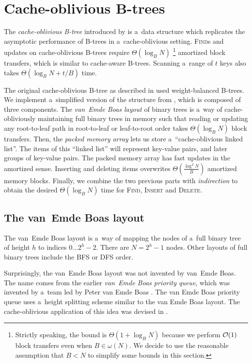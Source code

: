 \chapter{Cache-oblivious B-trees}
\label{chapter:cob}
The \emph{cache-oblivious B-tree} introduced by \cite{cobt}
is a~data structure which replicates the asymptotic performance of B-trees
in a~cache-oblivious setting.
\textsc{Find}s and updates on cache-oblivious B-trees require $\Theta(\log_B N)$
\footnote{Strictly speaking, the bound is $\Theta(1+\log_B N)$
	because we perform $\mathcal{O}(1)$ block transfers even when $B\in\omega(N)$.
	We decide to use the reasonable assumption that
	$B<N$ to simplify some bounds in this section.}
amortized block transfers, which is similar to cache-aware B-trees.
Scanning a~range of $t$ keys also takes $\Theta(\log_B N+t/B)$ time.

The original cache-oblivious B-tree as described in \cite{cobt} used
weight-balanced B-trees. We implement a~simplified version of the structure
from \cite{brodal01}, which is composed of three components.
The \emph{van~Emde Boas layout} of binary trees is a~way of cache-obliviously
maintaining full binary trees in memory such that reading or updating any
root-to-leaf path in root-to-leaf or leaf-to-root order takes $\Theta(\log_B N)$
block transfers.
Then, the \emph{packed memory array} lets us store a~``cache-oblivious linked
list''. The items of this ``linked list'' will represent key-value pairs,
and later groups of key-value pairs.
The packed memory array has fast updates in the amortized sense. Inserting
and deleting items overwrites $\Theta(\frac{\log^2 N}{B})$ amortized memory
blocks.
Finally, we combine the two previous parts with \emph{indirection} to obtain
the desired $\Theta(\log_B N)$ time for \textsc{Find}, \textsc{Insert} and
\textsc{Delete}.

\section{The van~Emde Boas layout}
The van~Emde Boas layout is a~way of mapping the nodes of a~full binary
tree of height $h$ to indices $0\ldots 2^h-2$. There are $N=2^h-1$ nodes.
Other layouts of full binary trees include the BFS or DFS order.

Surprisingly, the van~Emde Boas layout was not invented by van~Emde Boas.
The name comes from the earlier \emph{van~Emde Boas priority queue},
which was invented by a~team led by Peter van Emde Boas \cite{van-emde-boas}.
The van Emde Boas priority queue uses a~height splitting scheme similar
to the van Emde Boas layout. The cache-oblivious application of this idea
was devised in \cite{veb-layout}.

